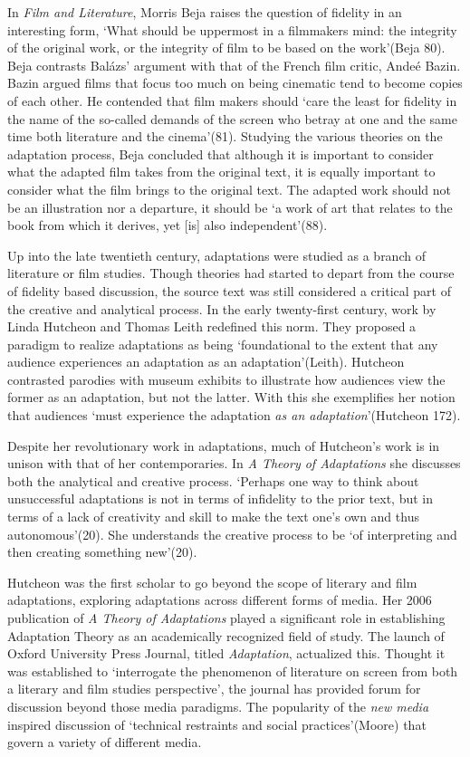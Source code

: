\documentclass[12pt]{article}
\begin{document}
In \textit{Film and Literature}, Morris Beja raises the question of fidelity in an interesting form, `What
should be uppermost in a filmmakers mind: the integrity of the original work,
or the integrity of film to be based on the work'(Beja 80). Beja contrasts Bal\'{a}zs'
argument with that of the French film critic, Ande\'{e} Bazin. Bazin argued
films that focus too much on being cinematic tend to become
copies of each other. He contended that film makers should `care the least for
fidelity in the name of the so-called demands of the screen who betray at one
and the same time both literature and the cinema'(81). Studying the various theories
on the adaptation process, Beja concluded that although it is important to
consider what the adapted film takes from the original text, it is equally
important to consider what the film brings to the original text. The adapted
work should not be an illustration nor a departure, it should be `a work of art
that relates to the book from which it derives, yet [is] also independent'(88). 

Up into the late twentieth century, adaptations were studied as a branch of
literature or film studies. Though theories had started to depart from the
course of fidelity based discussion, the source text was still considered a critical part
of the creative and analytical process. In the early twenty-first century,
work by Linda Hutcheon and Thomas Leith redefined this norm. 
They proposed a paradigm to realize adaptations as being `foundational to the 
extent that any audience experiences an adaptation as an adaptation'(Leith). Hutcheon
contrasted parodies with museum exhibits to illustrate how
audiences view the former as an adaptation, but not the latter. With this she
exemplifies her notion that audiences `must experience the 
adaptation \textit{as an adaptation}'(Hutcheon 172).

Despite her revolutionary work in adaptations, much of
Hutcheon's work is in unison with that of her contemporaries. In 
\textit{A Theory of Adaptations} she discusses both the analytical and 
creative process. `Perhaps one way to think about unsuccessful adaptations
is not in terms of infidelity to the prior text, but in terms of a lack of
creativity and skill to make the text one's own and thus autonomous'(20). She
understands the creative process to be `of interpreting and then creating
something new'(20).

Hutcheon was the first scholar to go beyond the scope of literary and film 
adaptations, exploring adaptations across different forms of media. 
Her 2006 publication of \textit{A Theory of Adaptations} played a significant 
role in establishing Adaptation Theory as an academically recognized field of
study. The launch of Oxford University Press Journal, titled \textit{Adaptation},
actualized this. Thought it was established to `interrogate the phenomenon
of literature on screen from both a literary and film studies perspective', 
the journal has provided forum for discussion beyond those media paradigms.
The popularity of the \textit{new media} inspired discussion of `technical
restraints and social practices'(Moore) that govern a variety of different media. 
\end{document}
